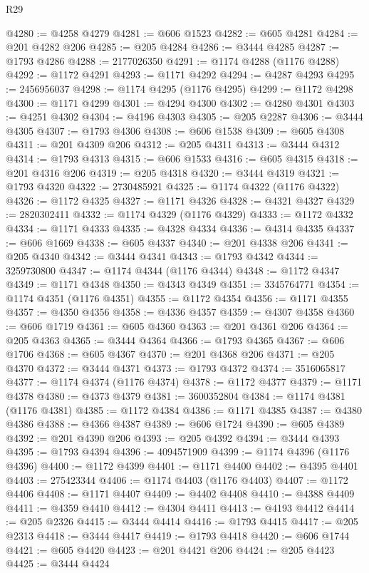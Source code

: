 \begin{lexlean}{R29}
\begin{coremodule}
@4280 := @4258 @4279
@4281 := @606 @1523
@4282 := @605 @4281
@4284 := @201 @4282 @206
@4285 := @205 @4284
@4286 := @3444 @4285
@4287 := @1793 @4286
@4288 := 2177026350
@4291 := @1174 @4288 (@1176 @4288)
@4292 := @1172 @4291
@4293 := @1171 @4292
@4294 := @4287 @4293
@4295 := 2456956037
@4298 := @1174 @4295 (@1176 @4295)
@4299 := @1172 @4298
@4300 := @1171 @4299
@4301 := @4294 @4300
@4302 := @4280 @4301
@4303 := @4251 @4302
@4304 := @4196 @4303
@4305 := @205 @2287
@4306 := @3444 @4305
@4307 := @1793 @4306
@4308 := @606 @1538
@4309 := @605 @4308
@4311 := @201 @4309 @206
@4312 := @205 @4311
@4313 := @3444 @4312
@4314 := @1793 @4313
@4315 := @606 @1533
@4316 := @605 @4315
@4318 := @201 @4316 @206
@4319 := @205 @4318
@4320 := @3444 @4319
@4321 := @1793 @4320
@4322 := 2730485921
@4325 := @1174 @4322 (@1176 @4322)
@4326 := @1172 @4325
@4327 := @1171 @4326
@4328 := @4321 @4327
@4329 := 2820302411
@4332 := @1174 @4329 (@1176 @4329)
@4333 := @1172 @4332
@4334 := @1171 @4333
@4335 := @4328 @4334
@4336 := @4314 @4335
@4337 := @606 @1669
@4338 := @605 @4337
@4340 := @201 @4338 @206
@4341 := @205 @4340
@4342 := @3444 @4341
@4343 := @1793 @4342
@4344 := 3259730800
@4347 := @1174 @4344 (@1176 @4344)
@4348 := @1172 @4347
@4349 := @1171 @4348
@4350 := @4343 @4349
@4351 := 3345764771
@4354 := @1174 @4351 (@1176 @4351)
@4355 := @1172 @4354
@4356 := @1171 @4355
@4357 := @4350 @4356
@4358 := @4336 @4357
@4359 := @4307 @4358
@4360 := @606 @1719
@4361 := @605 @4360
@4363 := @201 @4361 @206
@4364 := @205 @4363
@4365 := @3444 @4364
@4366 := @1793 @4365
@4367 := @606 @1706
@4368 := @605 @4367
@4370 := @201 @4368 @206
@4371 := @205 @4370
@4372 := @3444 @4371
@4373 := @1793 @4372
@4374 := 3516065817
@4377 := @1174 @4374 (@1176 @4374)
@4378 := @1172 @4377
@4379 := @1171 @4378
@4380 := @4373 @4379
@4381 := 3600352804
@4384 := @1174 @4381 (@1176 @4381)
@4385 := @1172 @4384
@4386 := @1171 @4385
@4387 := @4380 @4386
@4388 := @4366 @4387
@4389 := @606 @1724
@4390 := @605 @4389
@4392 := @201 @4390 @206
@4393 := @205 @4392
@4394 := @3444 @4393
@4395 := @1793 @4394
@4396 := 4094571909
@4399 := @1174 @4396 (@1176 @4396)
@4400 := @1172 @4399
@4401 := @1171 @4400
@4402 := @4395 @4401
@4403 := 275423344
@4406 := @1174 @4403 (@1176 @4403)
@4407 := @1172 @4406
@4408 := @1171 @4407
@4409 := @4402 @4408
@4410 := @4388 @4409
@4411 := @4359 @4410
@4412 := @4304 @4411
@4413 := @4193 @4412
@4414 := @205 @2326
@4415 := @3444 @4414
@4416 := @1793 @4415
@4417 := @205 @2313
@4418 := @3444 @4417
@4419 := @1793 @4418
@4420 := @606 @1744
@4421 := @605 @4420
@4423 := @201 @4421 @206
@4424 := @205 @4423
@4425 := @3444 @4424

\end{coremodule}
\end{lexlean}
